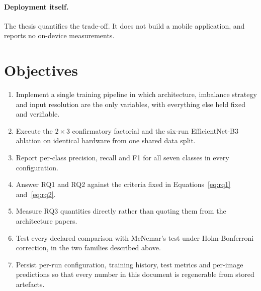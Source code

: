 \paragraph{Deployment itself.} The thesis quantifies the trade-off. It does not build a
mobile application, and reports no on-device measurements.

\section{Objectives}

\begin{enumerate}
  \item Implement a single training pipeline in which architecture, imbalance strategy
        and input resolution are the only variables, with everything else held fixed and
        verifiable.
  \item Execute the $2\times3$ confirmatory factorial and the six-run EfficientNet-B3
        ablation on identical hardware from one shared data split.
  \item Report per-class precision, recall and F1 for all seven classes in every
        configuration.
  \item Answer RQ1 and RQ2 against the criteria fixed in Equations~\ref{eq:rq1}
        and~\ref{eq:rq2}.
  \item Measure RQ3 quantities directly rather than quoting them from the architecture
        papers.
  \item Test every declared comparison with McNemar's test under Holm-Bonferroni
        correction, in the two families described above.
  \item Persist per-run configuration, training history, test metrics and per-image
        predictions so that every number in this document is regenerable from stored
        artefacts.
\end{enumerate}
